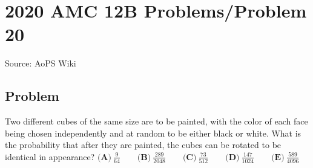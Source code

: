 \documentclass[12pt]{article}
\begin{document}
\section*{{2020 AMC 12B Problems/Problem 20}}
Source: AoPS Wiki

\subsection*{Problem}
Two different cubes of the same size are to be painted, with the color of each face being chosen independently and at random to be either black or white. What is the probability that after they are painted, the cubes can be rotated to be identical in appearance? $\textbf{(A)}\ \frac{9}{64} \qquad\textbf{(B)}\ \frac{289}{2048} \qquad\textbf{(C)}\ \frac{73}{512} \qquad\textbf{(D)}\ \frac{147}{1024} \qquad\textbf{(E)}\ \frac{589}{4096}$
\end{document}
